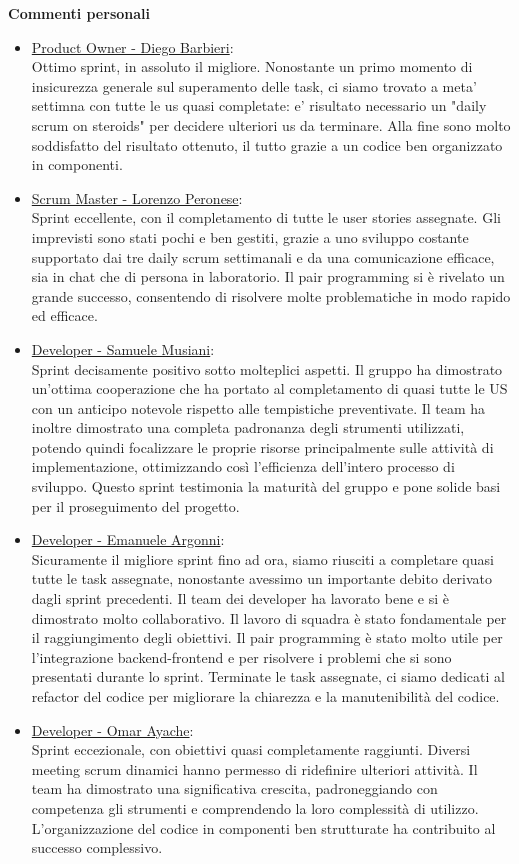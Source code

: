 \documentclass{article}
\begin{document}
\textbf{Commenti personali}
\begin{itemize}
    \item \underline{Product Owner - Diego Barbieri}: \\
    Ottimo sprint, in assoluto il migliore. Nonostante un primo momento di insicurezza generale sul superamento delle task, ci siamo trovato a meta' settimna con 
    tutte le us quasi completate: e' risultato necessario un "daily scrum on steroids" per decidere ulteriori us da terminare. Alla fine sono molto soddisfatto del 
    risultato ottenuto, il tutto grazie a un codice ben organizzato in componenti.
    \item \underline{Scrum Master - Lorenzo Peronese}: \\
    Sprint eccellente, con il completamento di tutte le user stories assegnate. Gli imprevisti sono stati pochi e ben gestiti, grazie a uno sviluppo costante 
    supportato dai tre daily scrum settimanali e da una comunicazione efficace, sia in chat che di persona in laboratorio. Il pair programming si è rivelato 
    un grande successo, consentendo di risolvere molte problematiche in modo rapido ed efficace.
    \item \underline{Developer - Samuele Musiani}: \\
    Sprint decisamente positivo sotto molteplici aspetti. Il gruppo ha dimostrato un'ottima cooperazione che ha portato al completamento di quasi tutte le US 
    con un anticipo notevole rispetto alle tempistiche preventivate. Il team ha inoltre dimostrato una completa padronanza degli strumenti utilizzati, potendo quindi 
    focalizzare le proprie risorse principalmente sulle attività di implementazione, ottimizzando così l'efficienza dell'intero processo di sviluppo. Questo sprint 
    testimonia la maturità del gruppo e pone solide basi per il proseguimento del progetto.
    \item \underline{Developer - Emanuele Argonni}: \\
    Sicuramente il migliore sprint fino ad ora, siamo riusciti a completare quasi tutte le task assegnate, nonostante avessimo un importante debito derivato 
    dagli sprint precedenti.
    Il team dei developer ha lavorato bene e si è dimostrato molto collaborativo. Il lavoro di squadra è stato fondamentale per il raggiungimento degli obiettivi.
    Il pair programming è stato molto utile per l'integrazione backend-frontend e per risolvere i problemi che si sono presentati durante lo sprint.
    Terminate le task assegnate, ci siamo dedicati al refactor del codice per migliorare la chiarezza e la manutenibilità del codice.
    \item \underline{Developer - Omar Ayache}:\\
    Sprint eccezionale, con obiettivi quasi completamente raggiunti. Diversi meeting scrum dinamici hanno permesso di ridefinire ulteriori attività. Il team ha dimostrato 
    una significativa crescita, padroneggiando con competenza gli strumenti e comprendendo la loro complessità di utilizzo. L'organizzazione del codice in componenti 
    ben strutturate ha contribuito al successo complessivo.    
\end{itemize} 
\end{document}
